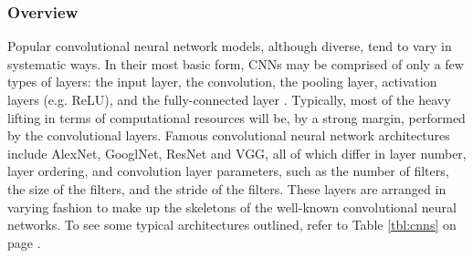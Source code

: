 \subsubsection{Overview}
Popular convolutional neural network models, although diverse, tend to vary in systematic ways. In their most basic form, CNNs may be comprised of only a few types of layers: the input layer, the convolution, the pooling layer, activation layers (e.g. ReLU), and the fully-connected layer \cite{convnets}. Typically, most of the heavy lifting in terms of computational resources will be, by a strong margin, performed by the convolutional layers. Famous convolutional neural network architectures include AlexNet, GooglNet, ResNet and VGG, all of which differ in layer number, layer ordering, and convolution layer parameters, such as the number of filters, the size of the filters, and the stride of the filters. These layers are arranged in varying fashion to make up the skeletons of the well-known convolutional neural networks. To see some typical architectures outlined, refer to Table \ref{tbl:cnns} on page \pageref{tbl:cnns}.

